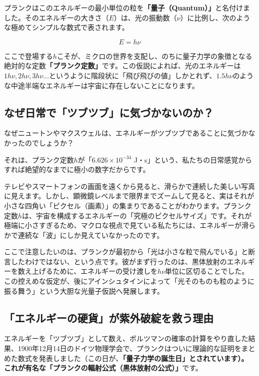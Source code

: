 プランクはこのエネルギーの最小単位の粒を\textbf{「量子（Quantum）」}と名付けました。そのエネルギーの大きさ（\(E\)）は、光の振動数（\(\nu\)）に比例し、次のような極めてシンプルな数式で表されます。

\[E = h\nu\]

ここで登場する\(h\)こそが、ミクロの世界を支配し、のちに量子力学の象徴となる絶対的な定数\textbf{「プランク定数」}です。この仮説によれば、光のエネルギーは\(1h\nu, 2h\nu, 3h\nu \dots\)というように階段状に「飛び飛びの値」しかとれず、\(1.5h\nu\)のような中途半端なエネルギーは宇宙に存在しないことになります。

\subsection{なぜ日常で「ツブツブ」に気づかないのか？}

なぜニュートンやマクスウェルは、エネルギーがツブツブであることに気づかなかったのでしょうか？

それは、プランク定数\(h\)が「\(6.626 \times 10^{-34}\) J・s」という、私たちの日常感覚からすれば絶望的なまでに極小の数字だからです。

テレビやスマートフォンの画面を遠くから見ると、滑らかで連続した美しい写真に見えます。しかし、顕微鏡レベルまで限界までズームして見ると、実はそれが小さな四角い「ピクセル（画素）」の集まりであることがわかります。プランク定数\(h\)は、宇宙を構成するエネルギーの「究極のピクセルサイズ」です。それが極端に小さすぎるため、マクロな視点で見ている私たちには、エネルギーが滑らかで連続な「波」にしか見えていなかったのです。

ここで注意したいのは、プランクが最初から「光は小さな粒で飛んでいる」と断言したわけではない、という点です。彼がまず行ったのは、黒体放射のエネルギーを数え上げるために、エネルギーの受け渡しを\(h\nu\)単位に区切ることでした。この控えめな仮定が、後にアインシュタインによって「光そのものも粒のように振る舞う」という大胆な光量子仮説へ発展します。

\subsection{「エネルギーの硬貨」が紫外破綻を救う理由}

エネルギーを「ツブツブ」として数え、ボルツマンの確率の計算をやり直した結果、1900年12月14日のドイツ物理学会で、プランクはついに理論的な証明をまとめた数式を発表しました（この日が、\textbf{「量子力学の誕生日」とされています）。 これが有名な「プランクの輻射公式（黒体放射の公式）」}です。

